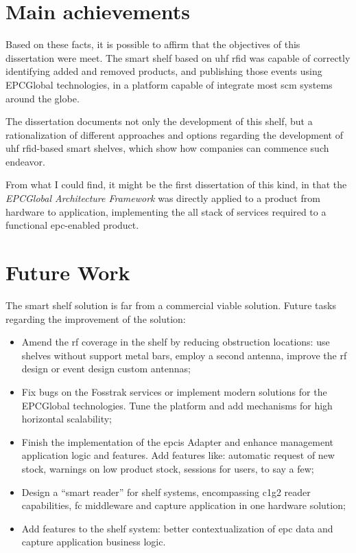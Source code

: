 \section{Main achievements}

Based on these facts, it is possible to affirm that the objectives of this dissertation were meet.
The smart shelf based on \ac{uhf} \ac{rfid} was capable of correctly identifying added and removed products, and publishing those events using EPCGlobal technologies, in a platform capable of integrate most \ac{scm} systems around the globe.

The dissertation documents not only the development of this shelf, but a rationalization of different approaches and options regarding the development of \ac{uhf} \ac{rfid}-based smart shelves, which show how companies can commence such endeavor.

From what I could find, it might be the first dissertation of this kind, in that the \emph{EPCGlobal Architecture Framework} was directly applied to a product from hardware to application, implementing the all stack of services required to a functional \ac{epc}-enabled product.

\section{Future Work}

The smart shelf solution is far from a commercial viable solution.
Future tasks regarding the improvement of the solution:

\begin{itemize}
    \item Amend the \ac{rf} coverage in the shelf by reducing obstruction locations: use shelves without support metal bars, employ a second antenna, improve the \ac{rf} design or event design custom antennas;
    \item Fix bugs on the Fosstrak services or implement modern solutions for the EPCGlobal technologies. Tune the platform and add mechanisms for high horizontal scalability;
    \item Finish the implementation of the \ac{epcis} Adapter and enhance management application logic and features. Add features like: automatic request of new stock, warnings on low product stock, sessions for users, to say a few;
    \item Design a ``smart reader'' for shelf systems, encompassing \ac{c1g2} reader capabilities, \ac{fc} middleware and capture application in one hardware solution;
    \item Add features to the shelf system: better contextualization of \ac{epc} data and capture application business logic.
\end{itemize}